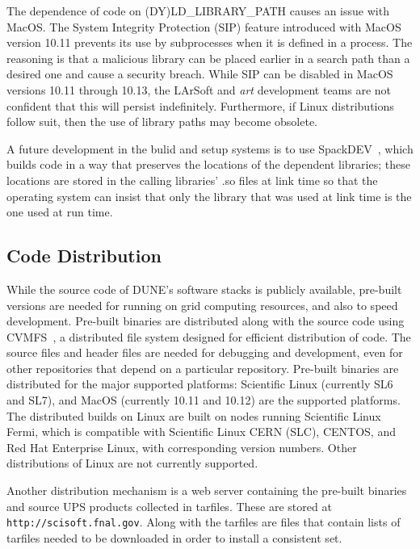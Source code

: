 The dependence of code on (DY)LD\_LIBRARY\_PATH causes an issue with MacOS.  The System Integrity Protection (SIP)
feature introduced with MacOS version 10.11 prevents its use by subprocesses when it is defined in a process.
The reasoning is that a malicious library can be placed earlier in a search path than a desired one and
cause a security breach.  While SIP can be disabled in MacOS versions 10.11 through 10.13, the LArSoft and
{\it art} development teams are not confident that this will persist indefinitely.  Furthermore, if Linux
distributions follow suit, then the use of library paths may become obsolete.

A future development in the bulid and setup systems is to use SpackDEV~\cite{SpackDEV}, which builds code in
a way that preserves the locations of the dependent libraries; these locations are stored in the calling
libraries' .so files at link time so that the operating system can insist that only the library that was used
at link time is the one used at run time.

\subsection{Code Distribution}

While the source code of DUNE's software stacks is publicly available, pre-built versions are needed
for running on grid computing resources, and also to speed development.  Pre-built binaries are distributed
along with the source code using CVMFS~\cite{CVMFS}, a distributed file system designed for efficient
distribution of code.  The source files and header files are needed for debugging and development,
even for other repositories that depend on a particular repository.  Pre-built binaries are distributed
for the major supported platforms:  Scientific Linux (currently SL6 and SL7), and MacOS (currently 10.11
and 10.12) are the supported platforms.  The distributed builds on Linux are built on nodes running
Scientific Linux Fermi, which is compatible with Scientific Linux CERN (SLC), CENTOS, and Red Hat Enterprise
Linux, with corresponding version numbers.  Other distributions of Linux are not currently supported.

Another distribution mechanism is a web server containing the pre-built binaries and source UPS products
collected in tarfiles.  These are stored at {\tt http://scisoft.fnal.gov}.  Along with the tarfiles are
files that contain lists of tarfiles needed to be downloaded in order to install a consistent set.

